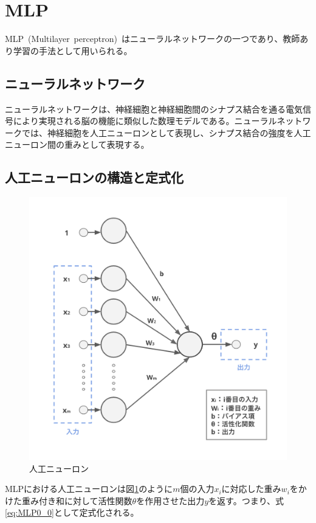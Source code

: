 \section{MLP}

MLP~(Multilayer~perceptron)~はニューラルネットワークの一つであり、教師あり学習の手法として用いられる。

\subsection{ニューラルネットワーク}

ニューラルネットワークは、神経細胞と神経細胞間のシナプス結合を通る電気信号により実現される脳の機能に類似した数理モデルである。ニューラルネットワークでは、神経細胞を人工ニューロンとして表現し、シナプス結合の強度を人工ニューロン間の重みとして表現する。

\subsection{人工ニューロンの構造と定式化}
\label{subsec:neuron}

\begin{figure}[b]
\begin{center}
\includegraphics[width=0.7\hsize]{figure/neuron.png}
\caption{人工ニューロン}
\label{fig:neuron}
\end{center}
\end{figure}

MLPにおける人工ニューロンは図\ref{fig:neuron}のように$m$個の入力$x_i$に対応した重み$w_i$をかけた重み付き和に対して活性関数$\theta$を作用させた出力$y$を返す。つまり、式\ref{eq:MLP0_0}として定式化される。

